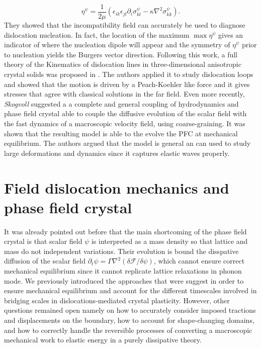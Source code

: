 \documentclass[11pt]{article}
\begin{document}
\begin{equation}
    \eta^{\psi} = \frac{1}{2\mu} \left( \epsilon_{ik} \epsilon_{jl} \partial_i \sigma_{kl}^{\psi} - \kappa \nabla^2 \sigma_{kk}^{\psi} \right).
\end{equation}
They showed that the incompatibility field can accurately be used to diagnose dislocation nucleation. In fact, the location of the maximum $\max \eta^\psi$ gives an indicator of where the nucleation dipole will appear and the symmetry of $\eta^\psi$ prior to nucleation yields the Burgers vector direction. Following this work, a full theory of the Kinematics of dislocation lines in three-dimensional anisotropic crystal solids was proposed in \parencite{skogvollphasefield2022}. The authors applied it to study dislocation loops and showed that the motion is driven by a Peach-Koehler like force and it gives stresses that agree with classical solutions in the far field. Even more recently, \emph{Skogvoll} \parencite{skogvollHydrodynamicphase2022} suggested a a complete and general coupling of hydrodynamics and phase field crystal able to couple the diffusive evolution of the scalar field with the fast dynamics of a macroscopic velocity field, using coarse-graining. It was shown that the resulting model is able to the evolve the PFC at mechanical equilibrium. The authors argued that the model is general an can used to study large deformations and dynamics since it captures elastic waves properly.
\section{Field dislocation mechanics and phase field crystal}
It was already pointed out before that the main shortcoming of the phase field crystal is that scalar field $\psi$ is interpreted as a mass density so that lattice and mass do not independent variations. Their evolution is bound the disspative diffusion of the scalar field $\partial_t \psi=\Gamma \nabla^2(\delta \mathcal{F}/\delta \psi)$, which cannot ensure correct mechanical equilibrium since it cannot replicate lattice relaxations in phonon mode. We previously introduced the approaches that were suggest in order to ensure mechanical equilibrium and account for the different timescales involved in bridging scales in dislocations-mediated crystal plasticity. However, other questions remained open namely on how to accurately consider imposed tractions and displacements on the boundary, how to account for shape-changing domains, and how to correctly handle the reversible processes of converting a macroscopic mechanical work to elastic energy in a purely dissipative theory.\\
\end{document}
